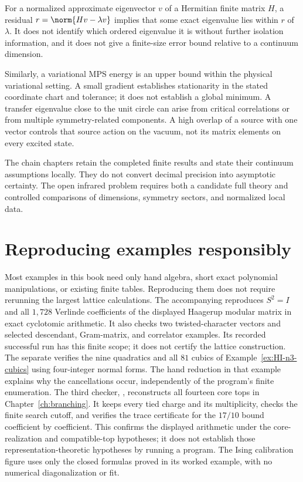 For a normalized approximate eigenvector $v$ of a Hermitian
finite matrix $H$, a residual
$r=\norm{Hv-\lambda v}$ implies that some exact eigenvalue lies
within $r$ of $\lambda$. It does not identify which ordered
eigenvalue it is without further isolation information, and it
does not give a finite-size error bound relative to a continuum
dimension.

Similarly, a variational MPS energy is an upper bound within the
physical variational setting. A small gradient establishes
stationarity in the stated coordinate chart and tolerance; it
does not establish a global minimum. A transfer eigenvalue close
to the unit circle can arise from critical correlations or from
multiple symmetry-related components. A high overlap of a
source with one vector controls that source action on the vacuum,
not its matrix elements on every excited state.

The chain chapters retain the completed finite results and state
their continuum assumptions locally. They do not convert decimal
precision into asymptotic certainty. The open infrared problem
requires both a candidate full theory and controlled comparisons
of dimensions, symmetry sectors, and normalized local data.

\section{Reproducing examples responsibly}

Most examples in this book need only hand algebra, short exact
polynomial manipulations, or existing finite tables. Reproducing
them does not require rerunning the largest lattice calculations.
The accompanying  reproduces
$S^2=I$ and all $1,728$ Verlinde coefficients of the displayed
Haagerup modular matrix in exact cyclotomic arithmetic. It also
checks two twisted-character vectors and selected descendant,
Gram-matrix, and correlator examples. Its recorded successful run
has this finite scope; it does not certify the lattice construction.
The separate  verifies the nine
quadratics and all $81$ cubics of
Example~\ref{ex:HI-n3-cubics} using four-integer normal forms.
The hand reduction in that example explains why the cancellations
occur, independently of the program's finite enumeration.
The third checker, , reconstructs
all fourteen core tops in Chapter~\ref{ch:branching}. It keeps every
tied charge and its multiplicity, checks the finite search cutoff,
and verifies the trace certificate for the $17/10$ bound coefficient
by coefficient. This confirms the displayed arithmetic under the
core-realization and compatible-top hypotheses; it does not establish
those representation-theoretic hypotheses by running a program.
The Ising calibration figure uses only the closed formulas proved
in its worked example, with no numerical diagonalization or fit.

